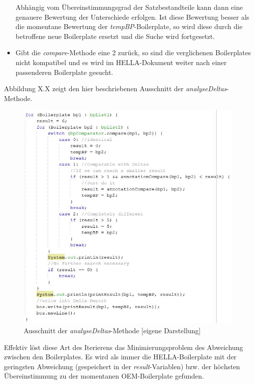 \documentclass[12pt]{report}
\begin{document}
\begin{itemize}
Abhängig vom Übereinstimmungsgrad der Satzbestandteile kann dann eine genauere Bewertung der Unterschiede erfolgen. Ist diese Bewertung besser als die momentane Bewertung der \textit{tempBP}-Boilerplate, so wird diese durch die betroffene neue Boilerplate ersetzt und die Suche wird fortgesetzt.

\item Gibt die \textit{compare}-Methode eine 2 zurück, so sind die verglichenen Boilerplates nicht kompatibel und es wird im HELLA-Dokument weiter nach einer passenderen Boilerplate gesucht.

\end{itemize}

Abbildung X.X zeigt den hier beschriebenen Ausschnitt der \textit{analyseDeltas}-Methode.
\begin{figure}[H]
\begin{center}
\includegraphics[scale=0.7]{Bilder/analyseDeltas.jpg}
\caption{Ausschnitt der \textit{analyseDeltas}-Methode [eigene Darstellung]}
\end{center}
\end{figure}

Effektiv löst diese Art des Iterierens das Minimierungsproblem des Abweichung zwischen den Boilerplates. Es wird als immer die HELLA-Boilerplate mit der geringsten Abweichung (gespeichert in der \textit{result}-Variablen) bzw. der höchsten Übereinstimmung zu der momentanen OEM-Boilerplate gefunden.
\end{document}

